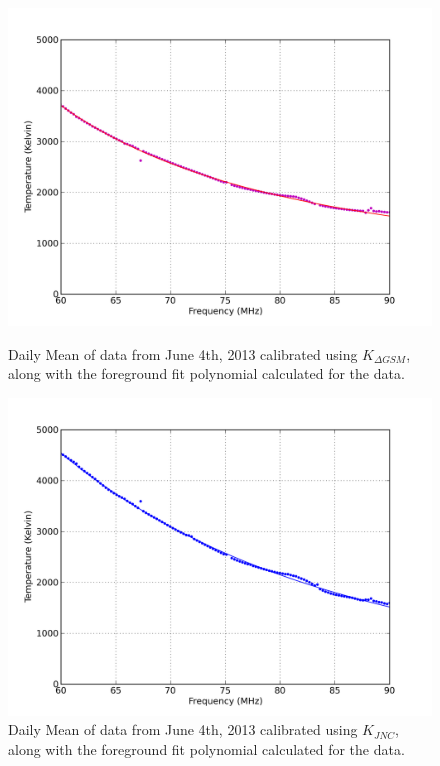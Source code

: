 \begin{figure}[htb]
\centering
\begin{minipage}[b]{0.48\textwidth}
\centering
\includegraphics[width=0.95\linewidth]{Data_analysis/figures/June_04_Kdgsm_mean_fit.png}
\caption{Daily Mean of data from June 4th, 2013 calibrated using $K_{\Delta GSM}$, along with the foreground fit polynomial calculated for the data. }
\label{Fig:Kdgsm_mean}
\end{minipage}%
\begin{minipage}[b]{0.02\textwidth}
\hspace{1cm}
\end{minipage}%
\begin{minipage}[b]{0.48\textwidth}
\centering
\includegraphics[width=0.95\linewidth]{Data_analysis/figures/June_04_Kt_mean_fit.png}
\caption{Daily Mean of data from June 4th, 2013 calibrated using $K_{JNC}$, along with the foreground fit polynomial calculated for the data. }
\label{Fig:Kjnc_mean}
\end{minipage}
\end{figure}



